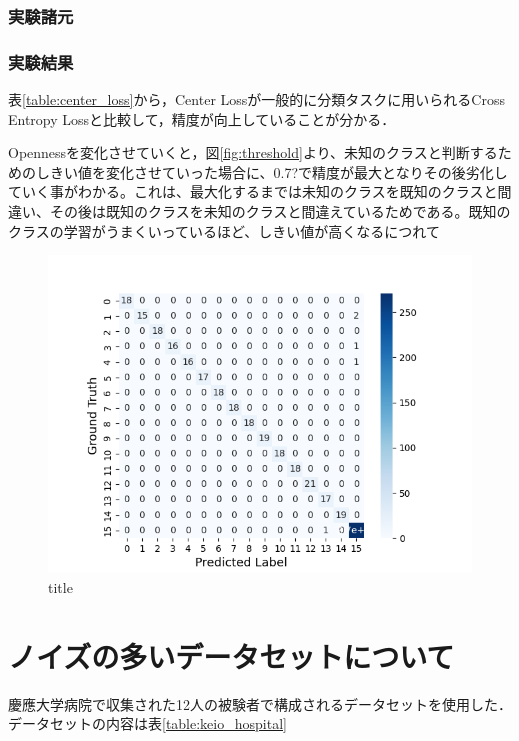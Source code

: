 \subsubsection{実験諸元}
\subsubsection{実験結果}
表\ref{table:center_loss}から，Center Lossが一般的に分類タスクに用いられるCross Entropy Lossと比較して，精度が向上していることが分かる．

Opennessを変化させていくと，図\ref{fig:threshold}より、未知のクラスと判断するためのしきい値を変化させていった場合に、0.7?で精度が最大となりその後劣化していく事がわかる。これは、最大化するまでは未知のクラスを既知のクラスと間違い、その後は既知のクラスを未知のクラスと間違えているためである。既知のクラスの学習がうまくいっているほど、しきい値が高くなるにつれて

\begin{figure}[H]
\begin{center}
\includegraphics[width=\linewidth]{./fig/clean_dataset/cross_val_Fold0_threshold0.8_15_15.png}
\end{center}
\caption{title}
\end{figure}


\section{ノイズの多いデータセットについて}
慶應大学病院で収集された12人の被験者で構成されるデータセットを使用した．データセットの内容は表\ref{table:keio_hospital}

